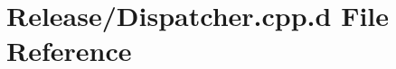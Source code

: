 \hypertarget{_release_2_dispatcher_8cpp_8d}{\section{\-Release/\-Dispatcher.cpp.\-d \-File \-Reference}
\label{_release_2_dispatcher_8cpp_8d}
}
